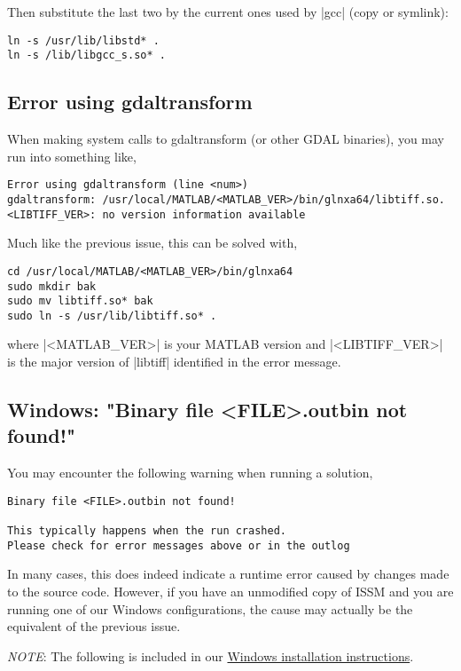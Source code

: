 Then substitute the last two by the current ones used by \lstinlinebg|gcc| (copy or symlink):
\begin{lstlisting}
ln -s /usr/lib/libstd* .
ln -s /lib/libgcc_s.so* .
\end{lstlisting}

\subsection*{Error using gdaltransform}%
When making system calls to gdaltransform (or other GDAL binaries), you may run into something like,
\begin{lstlisting}
Error using gdaltransform (line <num>)
gdaltransform: /usr/local/MATLAB/<MATLAB_VER>/bin/glnxa64/libtiff.so.<LIBTIFF_VER>: no version information available
\end{lstlisting}
Much like the previous issue, this can be solved with,
\begin{lstlisting}
cd /usr/local/MATLAB/<MATLAB_VER>/bin/glnxa64
sudo mkdir bak
sudo mv libtiff.so* bak
sudo ln -s /usr/lib/libtiff.so* .
\end{lstlisting}
where \lstinlinebg|<MATLAB_VER>| is your MATLAB version and \lstinlinebg|<LIBTIFF_VER>| is the major version of \lstinlinebg|libtiff| identified in the error message.

\subsection*{Windows: "Binary file <FILE>.outbin not found!"}%
You may encounter the following warning when running a solution,
\begin{lstlisting}
Binary file <FILE>.outbin not found!

This typically happens when the run crashed.
Please check for error messages above or in the outlog
\end{lstlisting}
In many cases, this does indeed indicate a runtime error caused by changes made to the source code. However, if you have an unmodified copy of ISSM and you are running one of our Windows configurations, the cause may actually be the equivalent of the previous issue.

\emph{NOTE}: The following is included in our 
\hyperref[sec:installation-windows]{Windows installation instructions}.

